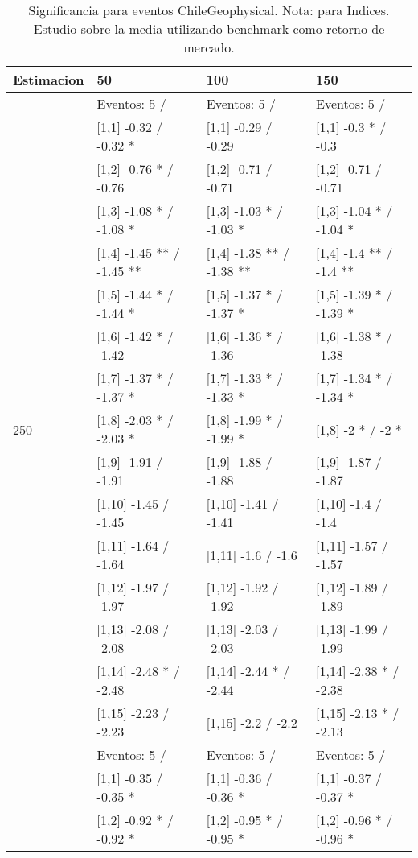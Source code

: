 \begin{table}

\caption{Significancia para eventos ChileGeophysical. Nota: para Indices. Estudio sobre la media utilizando benchmark como retorno de mercado.}
\centering
\begin{tabular}[t]{llll}
\toprule
Estimacion & 50 & 100 & 150\\
\midrule
 & Eventos:  5 / & Eventos:  5 / & Eventos:  5 /\\
 & {}[1,1] -0.32  / -0.32 * & {}[1,1] -0.29  / -0.29 & {}[1,1] -0.3 * / -0.3\\
 & {}[1,2] -0.76 * / -0.76 & {}[1,2] -0.71  / -0.71 & {}[1,2] -0.71  / -0.71\\
 & {}[1,3] -1.08 * / -1.08 * & {}[1,3] -1.03 * / -1.03 * & {}[1,3] -1.04 * / -1.04 *\\
 & {}[1,4] -1.45 ** / -1.45 ** & {}[1,4] -1.38 ** / -1.38 ** & {}[1,4] -1.4 ** / -1.4 **\\
\addlinespace
 & {}[1,5] -1.44 * / -1.44 * & {}[1,5] -1.37 * / -1.37 * & {}[1,5] -1.39 * / -1.39 *\\
 & {}[1,6] -1.42 * / -1.42 & {}[1,6] -1.36 * / -1.36 & {}[1,6] -1.38 * / -1.38\\
 & {}[1,7] -1.37 * / -1.37 * & {}[1,7] -1.33 * / -1.33 * & {}[1,7] -1.34 * / -1.34 *\\
250 & {}[1,8] -2.03 * / -2.03 * & {}[1,8] -1.99 * / -1.99 * & {}[1,8] -2 * / -2 *\\
 & {}[1,9] -1.91  / -1.91 & {}[1,9] -1.88  / -1.88 & {}[1,9] -1.87  / -1.87\\
\addlinespace
 & {}[1,10] -1.45  / -1.45 & {}[1,10] -1.41  / -1.41 & {}[1,10] -1.4  / -1.4\\
 & {}[1,11] -1.64  / -1.64 & {}[1,11] -1.6  / -1.6 & {}[1,11] -1.57  / -1.57\\
 & {}[1,12] -1.97  / -1.97 & {}[1,12] -1.92  / -1.92 & {}[1,12] -1.89  / -1.89\\
 & {}[1,13] -2.08  / -2.08 & {}[1,13] -2.03  / -2.03 & {}[1,13] -1.99  / -1.99\\
 & {}[1,14] -2.48 * / -2.48 & {}[1,14] -2.44 * / -2.44 & {}[1,14] -2.38 * / -2.38\\
\addlinespace
 & {}[1,15] -2.23  / -2.23 & {}[1,15] -2.2  / -2.2 & {}[1,15] -2.13 * / -2.13\\
 & Eventos:  5 / & Eventos:  5 / & Eventos:  5 /\\
 & {}[1,1] -0.35  / -0.35 * & {}[1,1] -0.36  / -0.36 * & {}[1,1] -0.37  / -0.37 *\\
 & {}[1,2] -0.92 * / -0.92 * & {}[1,2] -0.95 * / -0.95 * & {}[1,2] -0.96 * / -0.96 *\\

\end{tabular}
\end{table}
